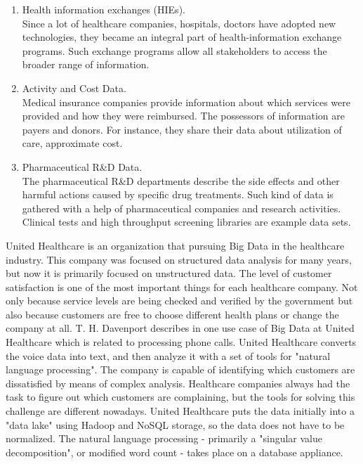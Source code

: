 \documentclass[runningheads]{llncs}
\begin{document}
\begin{enumerate}

\item Health information exchanges (HIEs).\\

Since a lot of healthcare companies, hospitals, doctors have adopted new technologies, they became an integral part of health-information exchange programs. Such exchange programs allow all stakeholders to access the broader range of information.\\

\item Activity and Cost Data.\\

Medical insurance companies provide information about which services were provided and how they were reimbursed. The possessors of information are payers and donors. For instance, they share their data about utilization of care, approximate cost.\\

\item Pharmaceutical R\&D Data.\\

The pharmaceutical R\&D departments describe the side effects and other harmful actions caused by specific drug treatments. Such kind of data is gathered with a help of pharmaceutical companies and research activities. Clinical tests and high throughput screening libraries are example data sets.\\
\end{enumerate}

United Healthcare is an organization that pursuing Big Data in the healthcare industry. This company was focused on structured data analysis for many years, but now it is primarily focused on unstructured data. The level of customer satisfaction is one of the most important things for each healthcare company. Not only because service levels are being checked and verified by the government but also because customers are free to choose different health plans or change the company at all. T. H. Davenport describes in \cite{DAVENPORT} one use case of Big Data at United Healthcare which is related to processing phone calls. United Healthcare converts the voice data into text, and then analyze it with a set of tools for "natural language processing". The company is capable of identifying which customers are dissatisfied by means of complex analysis. Healthcare companies always had the task to figure out which customers are complaining, but the tools for solving this challenge are different nowadays. United Healthcare puts the data initially into a "data lake" using Hadoop and NoSQL storage, so the data does not have to be normalized. The natural language processing - primarily a "singular value decomposition", or modified word count - takes place on a database appliance. 
\end{document}

